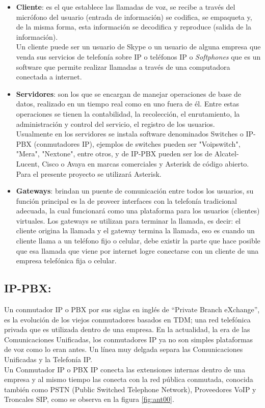\documentclass[conference]{IEEEtran}
\begin{document}
\begin{itemize}
\item \textbf{Cliente}: es el que establece las llamadas de voz, se recibe a través del micrófono del usuario (entrada de información) se codifica, se empaqueta y, de la misma forma, esta información se decodifica y reproduce (salida de la información).\\
Un cliente puede ser un usuario de Skype o un usuario de alguna empresa que venda sus servicios de telefonía sobre IP o teléfonos IP o \textit{Softphones} que es un software que permite realizar llamadas a través de una computadora conectada a internet.

\item \textbf{Servidores}: son los que se encargan de manejar operaciones de base de datos, realizado en un tiempo real como en uno fuera de él. Entre estas operaciones se tienen la contabilidad, la recolección, el enrutamiento, la administración y control del servicio, el registro de los usuarios.\\
Usualmente en los servidores se instala software denominados Switches o IP-PBX (conmutadores IP), ejemplos de switches pueden ser "Voipswitch", "Mera", "Nextone", entre otros, y de IP-PBX pueden ser los de Alcatel-Lucent, Cisco o Avaya en marcas comerciales y Asterisk de código abierto. Para el presente proyecto se utilizará Asterisk.
\item \textbf{Gateways}: brindan un puente de comunicación entre todos los usuarios, su función principal es la de proveer interfaces con la telefonía tradicional adecuada, la cual funcionará como una plataforma para los usuarios (clientes) virtuales. Los gateways se utilizan para terminar la llamada, es decir: el cliente origina la llamada y el gateway termina la llamada, eso es cuando un cliente llama a un teléfono fijo o celular, debe existir la parte que hace posible que esa llamada que viene por internet logre conectarse con un cliente de una empresa telefónica fija o celular.
\end{itemize}
\subsection{\textbf{ IP-PBX:}}
Un conmutador IP o PBX por sus siglas en inglés de “Private Branch eXchange”, es la evolución de los viejos conmutadores basados en TDM; una red telefónica privada que es utilizada dentro de una empresa. En la actualidad, la era de las Comunicaciones Unificadas, los conmutadores IP ya no son simples plataformas de voz como lo eran antes. Un línea muy delgada separa las Comunicaciones Unificadas y la Telefonía IP.\\
Un Conmutador IP o PBX IP conecta las extensiones internas dentro de una empresa y al mismo tiempo las conecta con la red pública conmutada, conocida también como PSTN (Public Switched Telephone Network), Proveedores VoIP y Troncales SIP, como se observa en la figura \ref{fig:ant00}.
\end{document}
